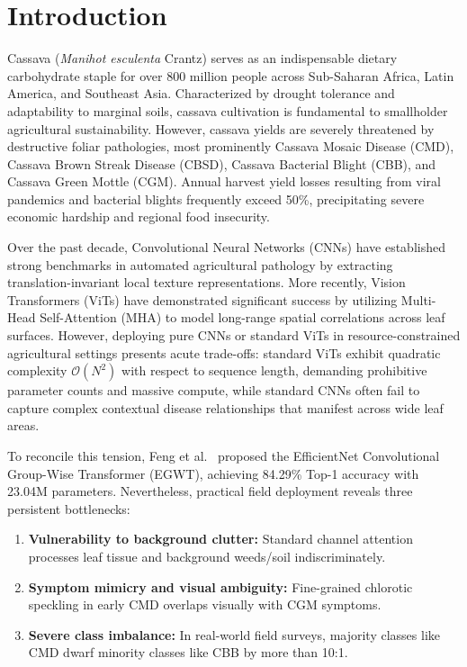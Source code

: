 \documentclass[conference]{IEEEtran}
\let\origsection\section
\renewcommand{\section}{\needspace{6\baselineskip}\origsection}
\begin{document}
\section{Introduction}
Cassava (\textit{Manihot esculenta} Crantz) serves as an indispensable dietary carbohydrate staple for over 800 million people across Sub-Saharan Africa, Latin America, and Southeast Asia. Characterized by drought tolerance and adaptability to marginal soils, cassava cultivation is fundamental to smallholder agricultural sustainability. However, cassava yields are severely threatened by destructive foliar pathologies, most prominently Cassava Mosaic Disease (CMD), Cassava Brown Streak Disease (CBSD), Cassava Bacterial Blight (CBB), and Cassava Green Mottle (CGM). Annual harvest yield losses resulting from viral pandemics and bacterial blights frequently exceed 50\%, precipitating severe economic hardship and regional food insecurity.

Over the past decade, Convolutional Neural Networks (CNNs) have established strong benchmarks in automated agricultural pathology by extracting translation-invariant local texture representations. More recently, Vision Transformers (ViTs) have demonstrated significant success by utilizing Multi-Head Self-Attention (MHA) to model long-range spatial correlations across leaf surfaces. However, deploying pure CNNs or standard ViTs in resource-constrained agricultural settings presents acute trade-offs: standard ViTs exhibit quadratic complexity $\mathcal{O}(N^2)$ with respect to sequence length, demanding prohibitive parameter counts and massive compute, while standard CNNs often fail to capture complex contextual disease relationships that manifest across wide leaf areas.

To reconcile this tension, Feng et al.~\cite{feng2024} proposed the EfficientNet Convolutional Group-Wise Transformer (EGWT), achieving 84.29\% Top-1 accuracy with 23.04M parameters. Nevertheless, practical field deployment reveals three persistent bottlenecks:
\begin{enumerate}
    \item \textbf{Vulnerability to background clutter:} Standard channel attention processes leaf tissue and background weeds/soil indiscriminately.
    \item \textbf{Symptom mimicry and visual ambiguity:} Fine-grained chlorotic speckling in early CMD overlaps visually with CGM symptoms.
    \item \textbf{Severe class imbalance:} In real-world field surveys, majority classes like CMD dwarf minority classes like CBB by more than 10:1.
\end{enumerate}
\end{document}
